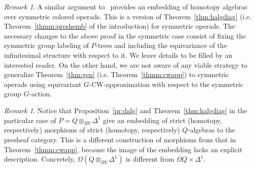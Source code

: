 \documentclass{amsart}
\theoremstyle{definition}
\theoremstyle{remark}
\newtheorem{remark}[formula]{Remark}
\begin{document}
	\begin{remark}\label{rem:symcase}
		A similar argument to~\cite[Theorem B.6]{clrrw-22} provides an embedding of homotopy algebras over symmetric colored operads.
		This is a version of Theorem~\ref{thm:halgdiag} (i.e. Theorem~\ref{thmm:preshemb} of the introduction) for symmetric operads.
		The necessary changes to the above proof in the symmetric case consist of fixing the symmetric group labeling of $P$-trees and including the equivariance of the infinitesimal structure with respect to it.
		We leave details to be filled by an interested reader.
		On the other hand, we are not aware of any viable strategy to generalize Theorem~\ref{thm:gen} (i.e. Theorem~\ref{thmm:cwapp}) to symmetric operads using equivariant $G$-CW-approximation with respect to the symmetric group $G$-action.
	\end{remark}

	\begin{remark}
		Notice that Proposition~\ref{pr:dalg} and Theorem~\ref{thm:halgdiag} in the particular case of $P=Q\otimes_{BV}\Delta^{1}$ give an embedding of strict (homotopy, respectively) morphisms of strict (homotopy, respectively) $Q$-algebras to the presheaf category.
		This is a different construction of morphisms from that in Theorem~\ref{thmm:cwapp}, because the image of the embedding lacks an explicit description. 
		Concretely, $\Omega(Q\otimes_{BV}\Delta^{1})$ is different from $\Omega Q\times\Delta^{1}$.
	\end{remark}

	
	\begin{bibdiv}
		\begin{biblist}[\resetbiblist{99}]
		\end{biblist}
	\end{bibdiv}
	
\end{document}
